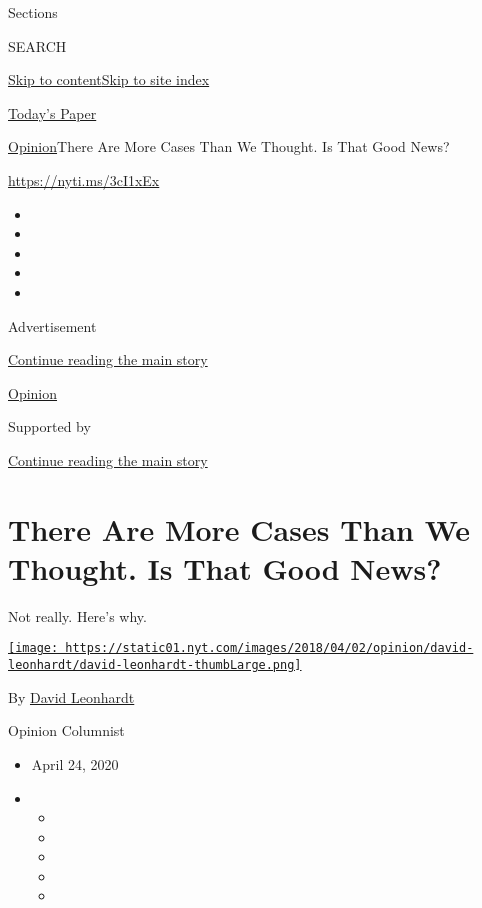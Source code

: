 Sections

SEARCH

\protect\hyperlink{site-content}{Skip to
content}\protect\hyperlink{site-index}{Skip to site index}

\href{https://myaccount.nytimes.com/auth/login?response_type=cookie\&client_id=vi}{}

\href{https://www.nytimes.com/section/todayspaper}{Today's Paper}

\href{/section/opinion}{Opinion}\textbar{}There Are More Cases Than We
Thought. Is That Good News?

\href{https://nyti.ms/3cI1xEx}{https://nyti.ms/3cI1xEx}

\begin{itemize}
\item
\item
\item
\item
\item
\end{itemize}

Advertisement

\protect\hyperlink{after-top}{Continue reading the main story}

\href{/section/opinion}{Opinion}

Supported by

\protect\hyperlink{after-sponsor}{Continue reading the main story}

\hypertarget{there-are-more-cases-than-we-thought-is-that-good-news}{%
\section{There Are More Cases Than We Thought. Is That Good
News?}\label{there-are-more-cases-than-we-thought-is-that-good-news}}

Not really. Here's why.

\href{https://www.nytimes.com/by/david-leonhardt}{\texttt{[image: https://static01.nyt.com/images/2018/04/02/opinion/david-leonhardt/david-leonhardt-thumbLarge.png]}}

By \href{https://www.nytimes.com/by/david-leonhardt}{David Leonhardt}

Opinion Columnist

\begin{itemize}
\item
  April 24, 2020
\item
  \begin{itemize}
  \item
  \item
  \item
  \item
  \item
  \end{itemize}
\end{itemize}

